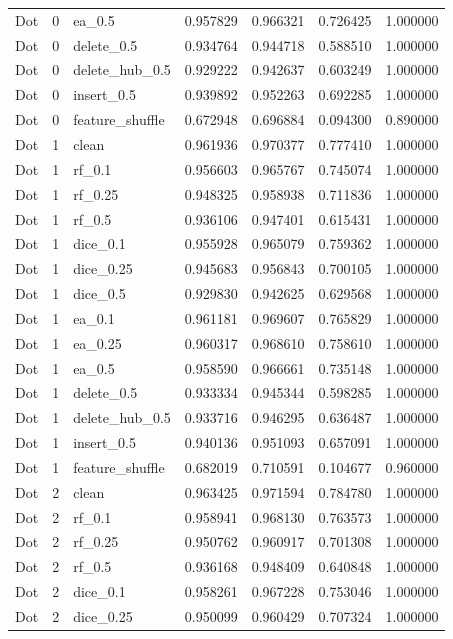 \documentclass[UTF8,a4paper,11pt,fontset=fandol]{ctexart}
\begin{document}
{\begin{longtable}{lrlrrrr}
Dot & 0 & ea\_0.5 & 0.957829 & 0.966321 & 0.726425 & 1.000000 \\
Dot & 0 & delete\_0.5 & 0.934764 & 0.944718 & 0.588510 & 1.000000 \\
Dot & 0 & delete\_hub\_0.5 & 0.929222 & 0.942637 & 0.603249 & 1.000000 \\
Dot & 0 & insert\_0.5 & 0.939892 & 0.952263 & 0.692285 & 1.000000 \\
Dot & 0 & feature\_shuffle & 0.672948 & 0.696884 & 0.094300 & 0.890000 \\
Dot & 1 & clean & 0.961936 & 0.970377 & 0.777410 & 1.000000 \\
Dot & 1 & rf\_0.1 & 0.956603 & 0.965767 & 0.745074 & 1.000000 \\
Dot & 1 & rf\_0.25 & 0.948325 & 0.958938 & 0.711836 & 1.000000 \\
Dot & 1 & rf\_0.5 & 0.936106 & 0.947401 & 0.615431 & 1.000000 \\
Dot & 1 & dice\_0.1 & 0.955928 & 0.965079 & 0.759362 & 1.000000 \\
Dot & 1 & dice\_0.25 & 0.945683 & 0.956843 & 0.700105 & 1.000000 \\
Dot & 1 & dice\_0.5 & 0.929830 & 0.942625 & 0.629568 & 1.000000 \\
Dot & 1 & ea\_0.1 & 0.961181 & 0.969607 & 0.765829 & 1.000000 \\
Dot & 1 & ea\_0.25 & 0.960317 & 0.968610 & 0.758610 & 1.000000 \\
Dot & 1 & ea\_0.5 & 0.958590 & 0.966661 & 0.735148 & 1.000000 \\
Dot & 1 & delete\_0.5 & 0.933334 & 0.945344 & 0.598285 & 1.000000 \\
Dot & 1 & delete\_hub\_0.5 & 0.933716 & 0.946295 & 0.636487 & 1.000000 \\
Dot & 1 & insert\_0.5 & 0.940136 & 0.951093 & 0.657091 & 1.000000 \\
Dot & 1 & feature\_shuffle & 0.682019 & 0.710591 & 0.104677 & 0.960000 \\
Dot & 2 & clean & 0.963425 & 0.971594 & 0.784780 & 1.000000 \\
Dot & 2 & rf\_0.1 & 0.958941 & 0.968130 & 0.763573 & 1.000000 \\
Dot & 2 & rf\_0.25 & 0.950762 & 0.960917 & 0.701308 & 1.000000 \\
Dot & 2 & rf\_0.5 & 0.936168 & 0.948409 & 0.640848 & 1.000000 \\
Dot & 2 & dice\_0.1 & 0.958261 & 0.967228 & 0.753046 & 1.000000 \\
Dot & 2 & dice\_0.25 & 0.950099 & 0.960429 & 0.707324 & 1.000000 \\

\end{longtable}}
\end{document}
